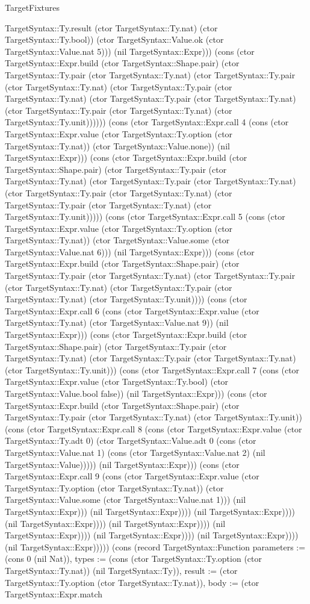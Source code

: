 \begin{lexlean}{TargetFixtures}
\begin{semanticmodule}
{TargetSyntax::Ty.result (ctor TargetSyntax::Ty.nat) (ctor TargetSyntax::Ty.bool)) (ctor TargetSyntax::Value.ok (ctor TargetSyntax::Value.nat 5))) (nil TargetSyntax::Expr))) (cons (ctor TargetSyntax::Expr.build (ctor TargetSyntax::Shape.pair) (ctor TargetSyntax::Ty.pair (ctor TargetSyntax::Ty.nat) (ctor TargetSyntax::Ty.pair (ctor TargetSyntax::Ty.nat) (ctor TargetSyntax::Ty.pair (ctor TargetSyntax::Ty.nat) (ctor TargetSyntax::Ty.pair (ctor TargetSyntax::Ty.nat) (ctor TargetSyntax::Ty.pair (ctor TargetSyntax::Ty.nat) (ctor TargetSyntax::Ty.unit)))))) (cons (ctor TargetSyntax::Expr.call 4 (cons (ctor TargetSyntax::Expr.value (ctor TargetSyntax::Ty.option (ctor TargetSyntax::Ty.nat)) (ctor TargetSyntax::Value.none)) (nil TargetSyntax::Expr))) (cons (ctor TargetSyntax::Expr.build (ctor TargetSyntax::Shape.pair) (ctor TargetSyntax::Ty.pair (ctor TargetSyntax::Ty.nat) (ctor TargetSyntax::Ty.pair (ctor TargetSyntax::Ty.nat) (ctor TargetSyntax::Ty.pair (ctor TargetSyntax::Ty.nat) (ctor TargetSyntax::Ty.pair (ctor TargetSyntax::Ty.nat) (ctor TargetSyntax::Ty.unit))))) (cons (ctor TargetSyntax::Expr.call 5 (cons (ctor TargetSyntax::Expr.value (ctor TargetSyntax::Ty.option (ctor TargetSyntax::Ty.nat)) (ctor TargetSyntax::Value.some (ctor TargetSyntax::Value.nat 6))) (nil TargetSyntax::Expr))) (cons (ctor TargetSyntax::Expr.build (ctor TargetSyntax::Shape.pair) (ctor TargetSyntax::Ty.pair (ctor TargetSyntax::Ty.nat) (ctor TargetSyntax::Ty.pair (ctor TargetSyntax::Ty.nat) (ctor TargetSyntax::Ty.pair (ctor TargetSyntax::Ty.nat) (ctor TargetSyntax::Ty.unit)))) (cons (ctor TargetSyntax::Expr.call 6 (cons (ctor TargetSyntax::Expr.value (ctor TargetSyntax::Ty.nat) (ctor TargetSyntax::Value.nat 9)) (nil TargetSyntax::Expr))) (cons (ctor TargetSyntax::Expr.build (ctor TargetSyntax::Shape.pair) (ctor TargetSyntax::Ty.pair (ctor TargetSyntax::Ty.nat) (ctor TargetSyntax::Ty.pair (ctor TargetSyntax::Ty.nat) (ctor TargetSyntax::Ty.unit))) (cons (ctor TargetSyntax::Expr.call 7 (cons (ctor TargetSyntax::Expr.value (ctor TargetSyntax::Ty.bool) (ctor TargetSyntax::Value.bool false)) (nil TargetSyntax::Expr))) (cons (ctor TargetSyntax::Expr.build (ctor TargetSyntax::Shape.pair) (ctor TargetSyntax::Ty.pair (ctor TargetSyntax::Ty.nat) (ctor TargetSyntax::Ty.unit)) (cons (ctor TargetSyntax::Expr.call 8 (cons (ctor TargetSyntax::Expr.value (ctor TargetSyntax::Ty.adt 0) (ctor TargetSyntax::Value.adt 0 (cons (ctor TargetSyntax::Value.nat 1) (cons (ctor TargetSyntax::Value.nat 2) (nil TargetSyntax::Value))))) (nil TargetSyntax::Expr))) (cons (ctor TargetSyntax::Expr.call 9 (cons (ctor TargetSyntax::Expr.value (ctor TargetSyntax::Ty.option (ctor TargetSyntax::Ty.nat)) (ctor TargetSyntax::Value.some (ctor TargetSyntax::Value.nat 1))) (nil TargetSyntax::Expr))) (nil TargetSyntax::Expr)))) (nil TargetSyntax::Expr)))) (nil TargetSyntax::Expr)))) (nil TargetSyntax::Expr)))) (nil TargetSyntax::Expr)))) (nil TargetSyntax::Expr)))) (nil TargetSyntax::Expr)))) (nil TargetSyntax::Expr))))}) (cons (record TargetSyntax::Function {parameters := (cons 0 (nil Nat)), types := (cons (ctor TargetSyntax::Ty.option (ctor TargetSyntax::Ty.nat)) (nil TargetSyntax::Ty)), result := (ctor TargetSyntax::Ty.option (ctor TargetSyntax::Ty.nat)), body := (ctor TargetSyntax::Expr.match }
\end{semanticmodule}
\end{lexlean}
